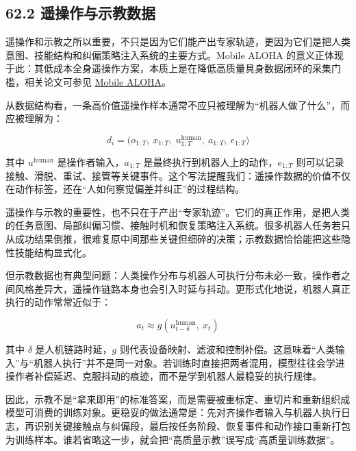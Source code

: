 \subsection*{62.2 遥操作与示教数据}


遥操作和示教之所以重要，不只是因为它们能产出专家轨迹，更因为它们是把人类意图、技能结构和纠偏策略注入系统的主要方式。Mobile ALOHA 的意义正体现于此：其低成本全身遥操作方案，本质上是在降低高质量具身数据闭环的采集门槛，相关论文可参见 \href{https://arxiv.org/abs/2401.02117}{Mobile ALOHA}。

从数据结构看，一条高价值遥操作样本通常不应只被理解为“机器人做了什么”，而应被理解为：

\begingroup
\footnotesize
\begin{equation*}
d_i = \bigl(o_{1:T},\ x_{1:T},\ u^{\text{human}}_{1:T},\ a_{1:T},\ e_{1:T}\bigr)
\end{equation*}
\endgroup

其中 \(u^{\text{human}}\) 是操作者输入，\(a_{1:T}\) 是最终执行到机器人上的动作，\(e_{1:T}\) 则可以记录接触、滑脱、重试、接管等关键事件。这个写法提醒我们：遥操作数据的价值不仅在动作标签，还在“人如何察觉偏差并纠正”的过程结构。

遥操作与示教的重要性，也不只在于产出“专家轨迹”。它们的真正作用，是把人类的任务意图、局部纠偏习惯、接触时机和恢复策略注入系统。很多机器人任务若只从成功结果倒推，很难复原中间那些关键但细碎的决策；示教数据恰恰能把这些隐性技能结构显式化。

但示教数据也有典型问题：人类操作分布与机器人可执行分布未必一致，操作者之间风格差异大，遥操作链路本身也会引入时延与抖动。更形式化地说，机器人真正执行的动作常常近似于：

\begingroup
\footnotesize
\begin{equation*}
a_t \approx g\!\left(u^{\text{human}}_{t-\delta},\ x_t\right)
\end{equation*}
\endgroup

其中 \(\delta\) 是人机链路时延，\(g\) 则代表设备映射、滤波和控制补偿。这意味着“人类输入”与“机器人执行”并不是同一对象。若训练时直接把两者混用，模型往往会学进操作者补偿延迟、克服抖动的痕迹，而不是学到机器人最稳妥的执行规律。

因此，示教不是“拿来即用”的标准答案，而是需要被重标定、重切片和重新组织成模型可消费的训练对象。更稳妥的做法通常是：先对齐操作者输入与机器人执行日志，再识别关键接触点与纠偏段，最后按任务阶段、恢复事件和动作接口重新打包为训练样本。谁若省略这一步，就会把“高质量示教”误写成“高质量训练数据”。

